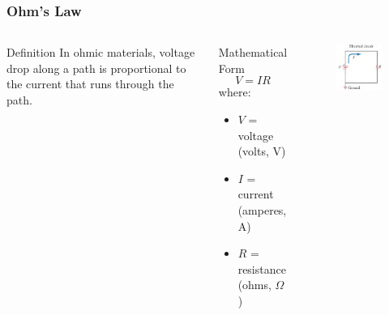\documentclass{beamer}
\begin{document}
\begin{frame}
    \frametitle{Ohm's Law}
    \begin{columns}
        \begin{block}{Definition}
            In ohmic materials, voltage drop along a path is proportional to the current that runs through the path.
        \end{block}
        
        \begin{block}{Mathematical Form}
            \begin{equation}
                V = IR
            \end{equation}
            where:
            \begin{itemize}
                \item $V$ = voltage (volts, V)
                \item $I$ = current (amperes, A)
                \item $R$ = resistance (ohms, $\Omega$)
            \end{itemize}
        \end{block}
        
        \begin{alertblock}{ }
            \begin{figure}
                \centering
                \includegraphics[width=1\linewidth]{phys11-circuits-simple-diagram.png}
            \end{figure}
        \end{alertblock}
    \end{columns}
\end{frame}
\end{document}
